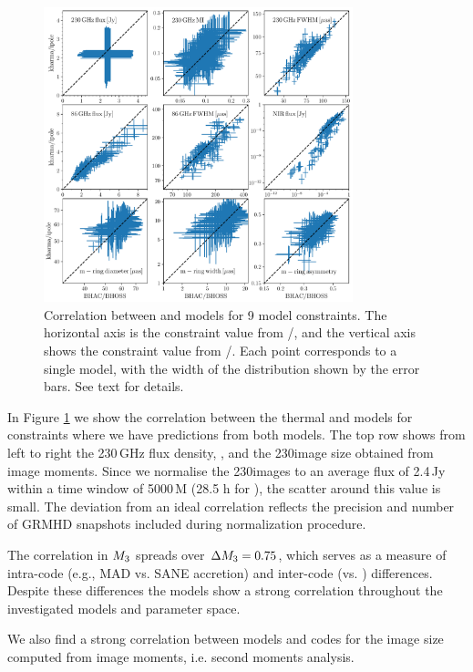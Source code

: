 \begin{figure}
  \centering
  \includegraphics[width=0.8\textwidth]{./figures/BHAC_iharm_correlationNew}
  \caption{Correlation between \bhac and \kharma models for 9 model constraints.
The horizontal axis is the constraint value from \bhac/\bhoss, and the vertical axis shows the constraint value from \kharma/\ipole.
Each point corresponds to a single model, with the width of the distribution shown by the error bars.
See text for details.}
  \label{fig:modelcorrelation}
\end{figure}

In Figure \ref{fig:modelcorrelation} we show the correlation between the thermal \kharma and \bhac models for constraints where we have predictions from both models.
The top row shows from left to right the 230\,GHz flux density, , and the 230\GHz image size obtained from image moments.
Since we normalise the 230\GHz images to an average flux of 2.4\,Jy within a time window of 5000\,M (28.5 h for \sgra), the scatter around this value is small.
The deviation from an ideal correlation reflects the precision and number of GRMHD snapshots included during normalization procedure.

The correlation in $M_{3}$ spreads over $\Delta M_{3}=0.75$, which serves as a measure of intra-code (e.g., MAD vs. SANE accretion) and inter-code (\bhac vs. \kharma) differences.
Despite these differences the models show a strong correlation throughout the investigated models and parameter space.

We also find a strong correlation between models and codes for the image size computed from image moments, i.e. second moments analysis.

